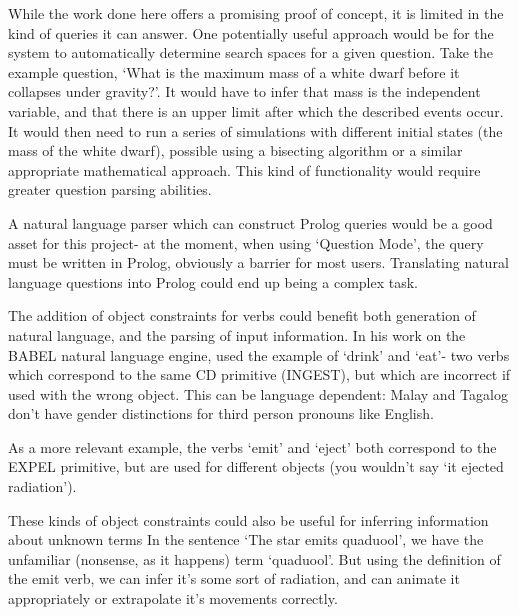 \documentclass{article}
\begin{document}
    While the work done here offers a promising proof of concept, it is limited in the kind of queries it can answer. One potentially useful approach would be for the system to automatically determine search spaces for a given question. Take the example question, `What is the maximum mass of a white dwarf before it collapses under gravity?'. It would have to infer that mass is the independent variable, and that there is an upper limit after which the described events occur. It would then need to run a series of simulations with different initial states (the mass of the white dwarf), possible using a bisecting algorithm or a similar appropriate mathematical approach. This kind of functionality would require greater question parsing abilities.

    A natural language parser which can construct Prolog queries would be a good asset for this project- at the moment, when using `Question Mode', the query must be written in Prolog, obviously a barrier for most users. Translating natural language questions into Prolog could end up being a complex task.

    The addition of object constraints for verbs could benefit both generation of natural language, and the parsing of input information. In his work on the BABEL natural language engine, \citeauthor{GOLDMAN1975289} used the example of `drink' and `eat'- two verbs which correspond to the same CD primitive (INGEST), but which are incorrect if used with the wrong object. This can be language dependent: Malay and Tagalog don't have gender distinctions for third person pronouns like English.

    As a more relevant example, the verbs `emit' and `eject' both correspond to the EXPEL primitive, but are used for different objects (you wouldn't say `it ejected radiation').

    These kinds of object constraints could also be useful for inferring information about unknown terms In the sentence `The star emits quaduool', we have the unfamiliar (nonsense, as it happens) term `quaduool'. But using the definition of the emit verb, we can infer it's some sort of radiation, and can animate it appropriately or extrapolate it's movements correctly.

    
    
\end{document}
